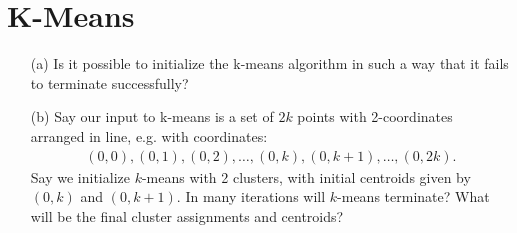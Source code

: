 \documentclass[11pt]{article}
\begin{document}
\begin{answertext}{23cm}{}
\end{answertext} 

\pagebreak


\section*{K-Means}

\begin{enumerate}
\item[(a)] Is it possible to initialize the k-means algorithm in such a way that it fails to terminate successfully?
\item[(b)] Say our input to k-means is a set of $2k$ points with 2-coordinates arranged in line, e.g. with coordinates:
{\small
\begin{align*}
(0,0), (0,1), (0, 2), \ldots, (0,k), (0,k+1), \ldots, (0,2k).
\end{align*}
}
Say we initialize $k$-means with 2 clusters, with initial centroids given by $(0,k)$ and $(0,k+1)$.  In many iterations will $k$-means terminate?  What will be the final cluster assignments and centroids?
\end{enumerate}

\begin{answertext}{15cm}{}
\end{answertext} 
\end{document}
